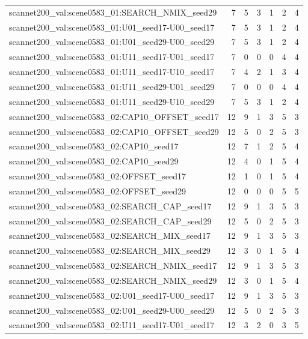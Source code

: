 \begin{table}[t]
\begin{tabular}{lrrrrrr}
scannet200\_val:scene0583\_01:SEARCH\_NMIX\_seed29 & 7 & 5 & 3 & 1 & 2 & 4 \\
scannet200\_val:scene0583\_01:U01\_seed17-U00\_seed17 & 7 & 5 & 3 & 1 & 2 & 4 \\
scannet200\_val:scene0583\_01:U01\_seed29-U00\_seed29 & 7 & 5 & 3 & 1 & 2 & 4 \\
scannet200\_val:scene0583\_01:U11\_seed17-U01\_seed17 & 7 & 0 & 0 & 0 & 4 & 4 \\
scannet200\_val:scene0583\_01:U11\_seed17-U10\_seed17 & 7 & 4 & 2 & 1 & 3 & 4 \\
scannet200\_val:scene0583\_01:U11\_seed29-U01\_seed29 & 7 & 0 & 0 & 0 & 4 & 4 \\
scannet200\_val:scene0583\_01:U11\_seed29-U10\_seed29 & 7 & 5 & 3 & 1 & 2 & 4 \\
scannet200\_val:scene0583\_02:CAP10\_OFFSET\_seed17 & 12 & 9 & 1 & 3 & 5 & 3 \\
scannet200\_val:scene0583\_02:CAP10\_OFFSET\_seed29 & 12 & 5 & 0 & 2 & 5 & 3 \\
scannet200\_val:scene0583\_02:CAP10\_seed17 & 12 & 7 & 1 & 2 & 5 & 4 \\
scannet200\_val:scene0583\_02:CAP10\_seed29 & 12 & 4 & 0 & 1 & 5 & 4 \\
scannet200\_val:scene0583\_02:OFFSET\_seed17 & 12 & 1 & 0 & 1 & 5 & 4 \\
scannet200\_val:scene0583\_02:OFFSET\_seed29 & 12 & 0 & 0 & 0 & 5 & 5 \\
scannet200\_val:scene0583\_02:SEARCH\_CAP\_seed17 & 12 & 9 & 1 & 3 & 5 & 3 \\
scannet200\_val:scene0583\_02:SEARCH\_CAP\_seed29 & 12 & 5 & 0 & 2 & 5 & 3 \\
scannet200\_val:scene0583\_02:SEARCH\_MIX\_seed17 & 12 & 9 & 1 & 3 & 5 & 3 \\
scannet200\_val:scene0583\_02:SEARCH\_MIX\_seed29 & 12 & 3 & 0 & 1 & 5 & 4 \\
scannet200\_val:scene0583\_02:SEARCH\_NMIX\_seed17 & 12 & 9 & 1 & 3 & 5 & 3 \\
scannet200\_val:scene0583\_02:SEARCH\_NMIX\_seed29 & 12 & 3 & 0 & 1 & 5 & 4 \\
scannet200\_val:scene0583\_02:U01\_seed17-U00\_seed17 & 12 & 9 & 1 & 3 & 5 & 3 \\
scannet200\_val:scene0583\_02:U01\_seed29-U00\_seed29 & 12 & 5 & 0 & 2 & 5 & 3 \\
scannet200\_val:scene0583\_02:U11\_seed17-U01\_seed17 & 12 & 3 & 2 & 0 & 3 & 5 \\

\end{tabular}
\end{table}
